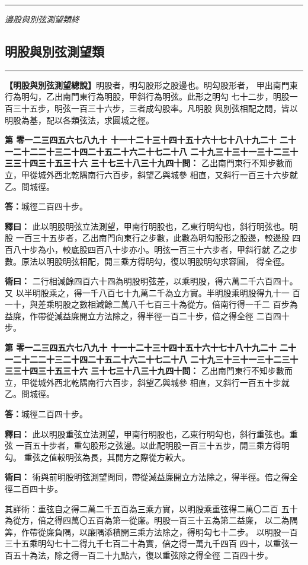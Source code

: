 \documentclass[11pt,a4paper]{article}
\newcommand{\longline}{\noindent\rule{\textwidth}{0.4pt}}
\newcounter{probnum}
\newcommand{\chnum}[1]{%
  \ifcase#1 零\or 一\or 二\or 三\or 四\or 五\or 六\or 七\or 八\or 九\or 十\or
    十一\or 十二\or 十三\or 十四\or 十五\or 十六\or 十七\or 十八\or 十九\or 二十\or
    二十一\or 二十二\or 二十三\or 二十四\or 二十五\or 二十六\or 二十七\or 二十八\or
    二十九\or 三十\or 三十一\or 三十二\or 三十三\or 三十四\or 三十五\or 三十六\or
    三十七\or 三十八\or 三十九\or 四十\fi}
\newcommand{\problem}[1]{\stepcounter{probnum}\par\noindent\textbf{第\chnum{\value{probnum}}問：}#1\par}
\newcommand{\answer}[1]{\par\noindent\textbf{答：}#1\par}
\newcommand{\shiyi}[1]{\par\noindent\textbf{釋曰：}#1\par}
\newcommand{\shuyue}[1]{\par\noindent\textbf{術曰：}#1\par}
\begin{document}
\vspace{0.5cm}
\longline
\begin{center}
\textit{邊股與別弦測望類終}
\end{center}

\newpage
\setcounter{probnum}{0}

\subsection*{明股與別弦測望類}
\vspace{0.3cm}
\longline
\vspace{0.3cm}

\noindent
\textbf{【明股與別弦測望總說】}明股者，明勾股形之股邊也。明勾股形者，
甲出南門東行為明勾，乙出南門東行為明股，甲斜行為明弦。此形之明勾
七十二步，明股一百三十五步，明弦一百三十六步，三者成勾股率。凡明股
與別弦相配之問，皆以明股為基，配以各類弦法，求圓城之徑。

\problem{
乙出南門東行不知步數而立，甲從城外西北乾隅南行六百步，斜望乙與城參
相直，又斜行一百三十六步就乙。問城徑。
}

\answer{城徑二百四十步。}

\shiyi{
此以明股明弦立法測望，甲南行明股也，乙東行明勾也，斜行明弦也。明股
一百三十五步者，乙出南門向東行之步數，此數為明勾股形之股邊，較邊股
四百八十步為小，較底股四百八十步亦小。明弦一百三十六步者，甲斜行就
乙之步數。原法以明股明弦相配，開三乘方得明勾，復以明股明勾求容圓，
得全徑。
}

\shuyue{
二行相減餘四百六十四為明股明弦差，以乘明股，得六萬二千六百四十。又
以半明股乘之，得一千八百七十九萬二千為立方實。半明股乘明股得九十一
百一十，與差乘明股之數相減餘二萬八千七百三十為從方。倍南行得一千二
百步為益廉，作帶從減益廉開立方法除之，得半徑一百二十步，倍之得全徑
二百四十步。
}

\vspace{0.3cm}
\problem{
乙出南門東行不知步數而立，甲從城外西北乾隅南行六百步，斜望乙與城參
相直，又斜行一百五十步就乙。問城徑。
}

\answer{城徑二百四十步。}

\shiyi{
此以明股重弦立法測望，甲南行明股也，乙東行明勾也，斜行重弦也。重弦
一百五十步者，重勾股形之弦邊。以此配明股一百三十五步，開三乘方得明勾。
重弦之值較明弦為長，其開方之際從方較大。
}

\shuyue{
術與前明股明弦測望問同，帶從減益廉開立方法除之，得半徑。倍之得全
徑二百四十步。

其詳術：重弦自之得二萬二千五百為三乘方實，以明股乘重弦得二萬〇二百
五十為從方，倍之得四萬〇五百為第一從廉。明股一百三十五為第二益廉，
以二為隅筭，作帶從廉負隅，以廉隅添積開三乘方法除之，得明勾七十二步。
以明股一百三十五乘明勾七十二得九千七百二十為實，倍之得一萬九千四百
四十，以重弦一百五十為法，除之得一百二十九點六，復以重弦除之得全徑
二百四十步。
}
\end{document}
